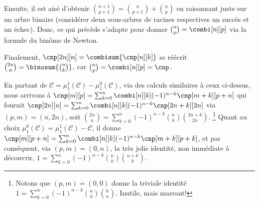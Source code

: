 Ensuite,
il est aisé d'obtenir
$\binom{n+1}{p+1} = \binom{n}{p+1} + \binom{n}{p}$
en raisonnant juste sur un arbre binaire (considérer deux sous-arbres de racines respectives un succès et un échec).
%
Donc, ce qui précède s'adapte pour donner $\binom{n}{p} = \combi[n][p]$ via la formule du binôme de Newton.

Finalement,
$\cnp[2n][n] = \combisum{\cnp[n][k]}$
se réécrit
$\binom{2n}{n} = \binosum{\binom{n}{k}}$,
car
$\binom{n}{p} = \combi[n][p] = \cnp$.




\begin{remark}
    En partant de
    $\mathcal{C} = \mu_1^1(\mathcal{C}) - \mu_1^0(\mathcal{C})$,
    via des calculs similaires à ceux ci-dessus,
    nous arrivons à
    $\cnp[m][p] = \sum_{k=0}^n \combi[n][k] (-1)^{n-k} \cnp[m+k][p+n]$
    qui fournit
    $\cnp[2n][n] = \sum_{k=0}^n \combi[n][k] (-1)^{n-k} \cnp[2n+k][2n]$
    via $(p,m) = (n,2n)$,
    soit
    $\binom{2n}{n} = \sum_{k=0}^n (-1)^{n-k} \binom{n}{k} \binom{2n+k}{2n}$.%
    \footnote{
        Notons que $(p,m) = (0,0)$ donne la triviale identité
        $1 = \sum_{k=0}^n (-1)^{n-k} \binom{n}{k} \binom{k}{n}$.
        Inutile, mais marrant!
    }
    Quant au choix
    $\mu_1^0(\mathcal{C}) = \mu_1^1(\mathcal{C}) - \mathcal{C}$,
    il donne
    $\cnp[m][p+n] = \sum_{k=0}^n \combi[n][k] (-1)^{n-k} \cnp[m+k][p+k]$,
    et par conséquent, via $(p,m) = (0,n)$, la très jolie identité, non immédiate à découvrir,
    $1 = \sum_{k=0}^n (-1)^{n-k} \binom{n}{k} \binom{n+k}{k}$.
\end{remark}
